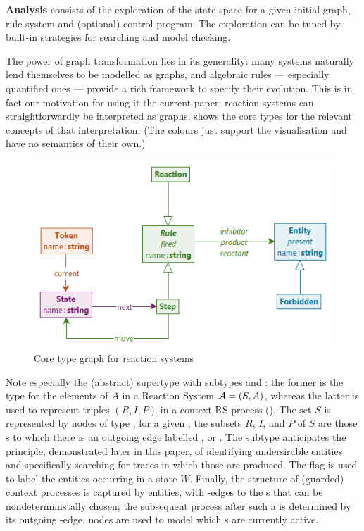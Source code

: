\textbf{Analysis} consists of the exploration of the state space for a given initial graph, rule system and (optional) control program. The exploration can be tuned by built-in strategies for searching and model checking.

\medskip\noindent
The power of graph transformation lies in its generality: many systems naturally lend themselves to be modelled as graphs, and algebraic rules --- especially quantified ones --- provide a rich framework to specify their evolution. This is in fact our motivation for using it the current paper: reaction systems can straightforwardly be interpreted as graphs.  shows the core types for the relevant concepts of that interpretation. (The colours just support the visualisation and have no semantics of their own.)

\begin{figure}
\centering
\includegraphics[scale=.2]{figs/core-type}
\caption{Core type graph for reaction systems}
\label{fig:core-type}
\end{figure}
%
Note especially the (abstract) supertype \Rule with subtypes \Reaction and \Step: the former is the type for the elements of $A$ in a Reaction System ${\cal A}=(S,A)$, whereas the latter is used to represent triples $(R,I,P)$ in a context RS process (). The set $S$ is represented by nodes of type \Entity; for a given \Rule, the subsets $R$, $I$, and $P$ of $S$ are those \Entity{}s to which there is an outgoing edge labelled \reactant, \inhibitor or \product. The subtype \Forbidden anticipates the principle, demonstrated later in this paper, of identifying undersirable entities and specifically searching for traces in which those are produced. The flag \present is used to label the entities occurring in a state $W$. Finally, the structure of (guarded) context processes is captured by \State entities, with \nextt-edges to the \Step{}s that can be nondeterministally chosen; the subsequent process after such a \Step is determined by its outgoing \move-edge. \Token nodes are used to model which \State{}s are currently active.

